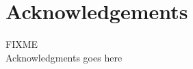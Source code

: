 \documentclass[a4paper]{article}
\begin{document}
\section{Acknowledgements}

FIXME\\
Acknowledgments goes here\\

 


%
%
%
\end{document}
